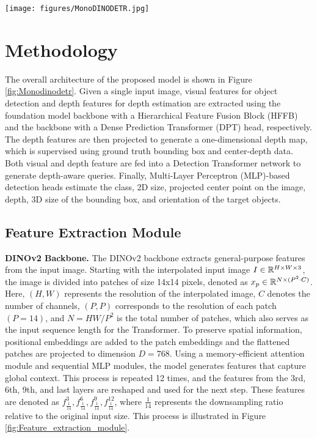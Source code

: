 \begin{figure*}[h]
    \centering
    \texttt{[image: figures/MonoDINODETR.jpg]}
    \caption[Overall Structure of MonoDINO-DETR]{\textbf{Overall Structure of MonoDINO-DETR.} The proposed method, \textbf{MonoDINO-DETR}, is composed of four main components: the Feature Extraction Module, the Object-Wise Supervision Module, the Depth-Aware Transformer, and the MLP-Based Detection Heads. The visual feature extraction process is represented in green, while the depth feature extraction process is represented in blue.
    } \label{fig:Monodinodetr}
\end{figure*}
\section{Methodology}
\label{sec:methodology}
The overall architecture of the proposed model is shown in Figure \ref{fig:Monodinodetr}. Given a single input image, visual features for object detection and depth features for depth estimation are extracted using the foundation model backbone with a Hierarchical Feature Fusion Block (HFFB) and the backbone with a Dense Prediction Transformer (DPT) \cite{ranftl2021vision} head, respectively. The depth features are then projected to generate a one-dimensional depth map, which is supervised using ground truth bounding box and center-depth data. Both visual and depth feature are fed into a Detection Transformer network to generate depth-aware queries. Finally, Multi-Layer Perceptron (MLP)-based detection heads estimate the class, 2D size, projected center point on the image, depth, 3D size of the bounding box, and orientation of the target objects.

\subsection{Feature Extraction Module}
\textbf{DINOv2 Backbone.} The DINOv2 \cite{oquab2023dinov2} backbone extracts general-purpose features from the input image. Starting with the interpolated input image $I \in \Bbb{R}^{H\times W \times 3}$, the image is divided into patches of size 14x14 pixels, denoted as $x_{p} \in \Bbb{R}^{N \times (P^2 \cdot C)}$. Here, $(H, W)$ represents the resolution of the interpolated image, $C$ denotes the number of channels, $(P, P)$ corresponds to the resolution of each patch $(P=14)$, and $N=HW/P^2$ is the total number of patches, which also serves as the input sequence length for the Transformer. To preserve spatial information, positional embeddings are added to the patch embeddings and the flattened patches are projected to dimension $D=768$.
Using a memory-efficient attention module and sequential MLP modules, the model generates features that capture global context.
This process is repeated 12 times, and the features from the 3rd, 6th, 9th, and last layers are reshaped and used for the next step. These features are denoted as $f_{\frac{1}{14}}^3, f_{\frac{1}{14}}^6, f_{\frac{1}{14}}^9, f_{\frac{1}{14}}^{12}$, where $\frac{1}{14}$ represents the downsampling ratio relative to the original input size. This process is illustrated in Figure \ref{fig:Feature_extraction_module}.

